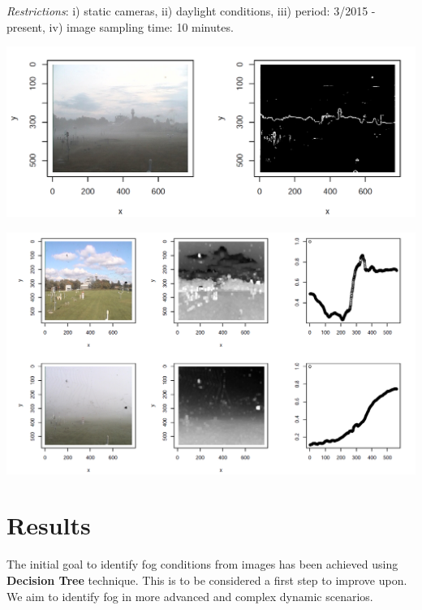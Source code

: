 \documentclass{article}
\begin{document}
\textit{Restrictions}: 
i) static cameras,
ii) daylight conditions,
iii) period: 3/2015 - present, 
iv) image sampling time: 10 minutes.
\cite{TECO}




\begin{minipage}[b]{\columnwidth}
	\begin{center}
	\includegraphics[width=0.95\columnwidth]{edges}
	\label{figEdges}
	\end{center}
\end{minipage}

\begin{minipage}[b]{\columnwidth}
	\begin{center}
	\includegraphics[width=0.95\columnwidth]{transmission}
	\label{figTransmission}
	\end{center}
\end{minipage}
\vspace*{-5cm}


\section*{Results}
The initial goal to identify fog conditions from images has been achieved using \textbf{Decision Tree} technique. This is to be considered a first step to improve upon. We aim to identify fog in more advanced and complex dynamic scenarios.
\end{document}
